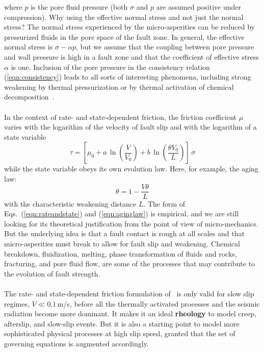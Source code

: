 \documentclass[letterpaper,12pt,]{memoir}
\begin{document}
where $p$ is the pore fluid pressure (both $\sigma$ and $p$ are assumed positive under compression). Why using the effective normal stress and not just the normal stress? The normal stress experienced by the micro-asperities can be reduced by pressurized fluids in the pore space of the fault zone. In general, the effective normal stress is $\sigma-\alpha p$, but we assume that the coupling between pore pressure and wall pressure is high in a fault zone and that the coefficient of effective stress $\alpha$ is one. Inclusion of the pore pressure in the consistency relation (\ref{eqn:consistency}) leads to all sorts of interesting phenomena, including strong weakening by thermal pressurization or by thermal activation of chemical decomposition~\citep[e.g.,][]{rice06a,sulem&famin09,noda&lapusta10}.\\
%
\\
In the context of rate- and state-dependent friction, the friction coefficient $\mu$ varies with the logarithm of the velocity of fault slip and with the logarithm of a state variable~\citep{dieterich78}
\begin{equation}\label{eqn:rateandstate}
\tau=\left[\mu_0+a\,\ln\left(\frac{V}{V_0}\right)+b\,\ln\left(\frac{\theta V_0}{L}\right)\right]\,\sigma
\end{equation}
while the state variable obeys its own evolution law. Here, for example, the aging law:
\begin{equation}\label{eqn:aginglaw}
\dot{\theta}=1-\frac{V\theta}{L}
\end{equation}
with the characteristic weakening distance $L$. The form of Eqs.~(\ref{eqn:rateandstate}) and (\ref{eqn:aginglaw}) is empirical, and we are still looking for its theoretical justification from the point of view of micro-mechanics. But the underlying idea is that a fault contact is rough at all scales and that micro-asperities must break to allow for fault slip and weakening. Chemical breakdown, fluidization, melting, phase transformation of fluids and rocks, fracturing, and pore fluid flow, are some of the processes that may contribute to the evolution of fault strength.\\
%
\\
The rate- and state-dependent friction formulation of~\cite{dieterich78} is only valid for slow slip regimes, $V\ll 0.1$\,m/s, before all the thermally activated processes and the seismic radiation become more dominant. It makes it an ideal \textbf{rheology} to model creep, afterslip, and slow-slip events. But it is also a starting point to model more sophisticated physical processes at high slip speed, granted that the set of governing equations is augmented accordingly. \\
\end{document}
